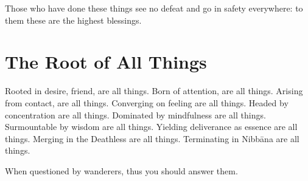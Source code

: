 Those who have done these things see no defeat and go in safety everywhere: to
them these are the highest blessings.


\section*{The Root of All Things}

Rooted in desire, friend, are all things.
Born of attention, are all things.
Arising from contact, are all things.
Converging on feeling are all things.
Headed by concentration are all things.
Dominated by mindfulness are all things.
Surmountable by wisdom are all things.
Yielding deliverance as essence are all things.
Merging in the Deathless are all things.
Terminating in Nibbāna are all things.

When questioned by wanderers, thus you should answer them.


